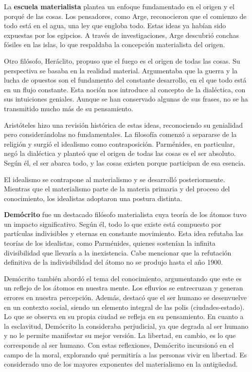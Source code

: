\documentclass[
  a4paper,
]{article}
\begin{document}
La \textbf{escuela materialista} plantea un enfoque fundamentado en el
origen y el porqué de las cosas. Los pensadores, como Arge, reconocieron
que el comienzo de todo está en el agua, una ley que engloba todo. Estas
ideas ya habían sido expuestas por los egipcios. A través de
investigaciones, Arge descubrió conchas fósiles en las islas, lo que
respaldaba la concepción materialista del origen.

Otro filósofo, Heráclito, propuso que el fuego es el origen de todas las
cosas. Su perspectiva se basaba en la realidad material. Argumentaba que
la guerra y la lucha de opuestos son el fundamento del constante
desarrollo, en el que todo está en un flujo constante. Esta noción nos
introduce al concepto de la dialéctica, con sus intuiciones geniales.
Aunque se han conservado algunas de sus frases, no se ha transmitido
mucho más de su pensamiento.

Aristóteles hizo una revisión histórica de estas ideas, reconociendo su
genialidad pero considerándolas no fundamentales. La filosofía comenzó a
separarse de la religión y surgió el idealismo como contraposición.
Parménides, en particular, negó la dialéctica y planteó que el origen de
todas las cosas es el ser absoluto. Según él, el ser abarca todo, y las
cosas existen porque participan de esa esencia.

El idealismo se contrapone al materialismo y se desarrolló
posteriormente. Mientras que el materialismo parte de la materia
primaria y del proceso del conocimiento, los idealistas adoptaron una
postura distinta.

\textbf{Demócrito} fue un destacado filósofo materialista cuya teoría de
los átomos tuvo un impacto significativo. Según él, todo lo que existe
está compuesto por partículas indivisibles y eternas en constante
movimiento. Esta idea refutaba las teorías de los idealistas, como
Parménides, quienes sostenían la infinita divisibilidad que llevaría a
la inexistencia. Cabe mencionar que la refutación definitiva de la
indivisibilidad del átomo no se produjo hasta el año 1900.

Demócrito también abordó el tema del conocimiento, argumentando que este
es un reflejo de los átomos en nuestra mente. Los efluvios se
entrecruzan y generan errores en nuestra percepción. Además, destacó que
el ser humano se desenvuelve en un contexto social, siendo un elemento
integral de las polis (ciudades-estado). Lo que se observa en su propia
ciudad se refleja en su pensamiento. En cuanto a la esclavitud,
Demócrito la consideraba perjudicial, ya que degrada al ser humano y no
le permite manifestar su mejor versión. La libertad, en cambio, es lo
que corresponde al ser humano. Con estas reflexiones, Demócrito
incursionó en el campo de la moral, explorando qué permitiría a las
personas vivir en libertad. Es considerado uno de los mayores exponentes
del materialismo en la antigüedad.
\end{document}
